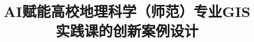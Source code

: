 \documentclass[12pt, a4paper]{article}
\begin{document}
\title{\textbf{AI赋能高校地理科学（师范）专业GIS实践课的创新案例设计}}
\author{}
\date{}

\maketitle









\end{document}
